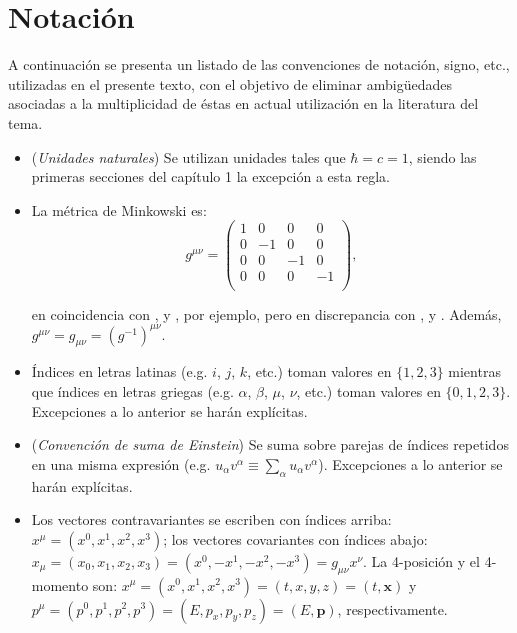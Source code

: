 \chapter*{Notación}
\label{chap:NOT}

\small{
\noindent A continuación se presenta un listado de las convenciones de notación, signo, etc., utilizadas en el presente texto, con el objetivo de eliminar ambigüedades asociadas a la multiplicidad de éstas en actual utilización en la literatura del tema. 
\begin{itemize}

	\item (\textit{Unidades naturales}) Se utilizan unidades tales que $\hbar=c=1$, siendo las primeras secciones del capítulo 1 la excepción a esta regla.

	\item La métrica de Minkowski es:
	\begin{equation*} 
		g^{\mu\nu}=	\begin{pmatrix}
					1 & 0 & 0 & 0 \\
					0 & -1 & 0 & 0 \\
					0 & 0 & -1 & 0 \\
					0 & 0 & 0 & -1 \\
					\end{pmatrix},
	\end{equation*}
	
	\noindent en coincidencia con \citep{Itzykson}, \citep{Bjorken} y \citep{GreinerRQM}, por ejemplo, pero en discrepancia con \citep{Lurie}, \citep{RobinsonSymmetry} y \citep{WeinbergQTF}. Además, $g^{\mu \nu}=g_{\mu \nu}=(g^{-1})^{\mu \nu}$.
	
	\item Índices en letras latinas (e.g. $i$, $j$, $k$, etc.) toman valores en $\{1,2,3\}$ mientras que índices en letras griegas (e.g. $\alpha$, $\beta$, $\mu$, $\nu$, etc.) toman valores en $\{0,1,2,3\}$. Excepciones a lo anterior se harán explícitas.

	\item (\textit{Convención de suma de Einstein}) Se suma sobre parejas de índices repetidos en una misma expresión (e.g. $u_\alpha v^{\alpha} \equiv \sum_\alpha u_\alpha v^{\alpha} $). Excepciones a lo anterior se harán explícitas. 
	
	\item Los vectores contravariantes se escriben con índices arriba: $x^{\mu}=(x^0,x^1,x^2,x^3)$; los vectores covariantes con índices abajo: $x_{\mu}=(x_0,x_1,x_2,x_3)=(x^0,-x^1,-x^2,-x^3)=g_{\mu \nu}x^{\nu}$. La 4-posición y el 4-momento son: $x^{\mu}=(x^0,x^1,x^2,x^3)=(t,x,y,z)=(t,\mathbf{x})$ y $p^{\mu}=(p^0,p^1,p^2,p^3)=(E,p_x,p_y,p_z)=(E,\mathbf{p})$, respectivamente. 
	

\end{itemize}}
